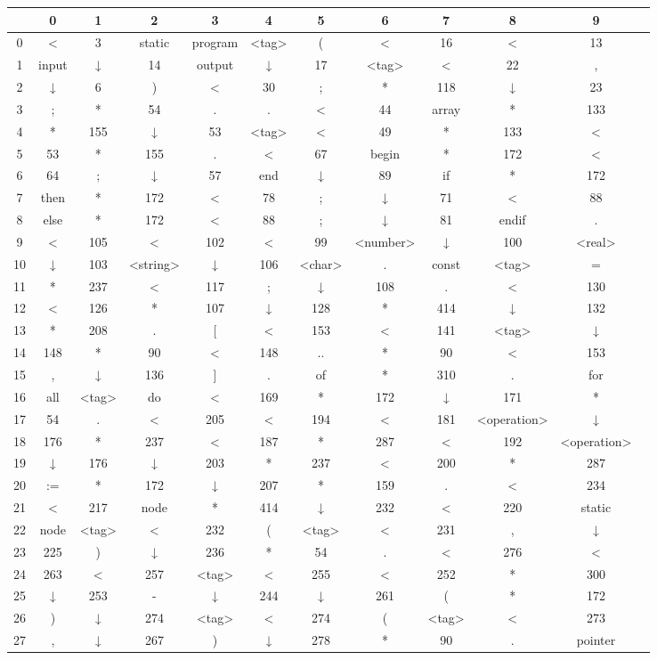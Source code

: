 \documentclass[12pt]{article}
\begin{document}
\begin{table}
\begin{small}
\begin{tabular}{|c|c|c|c|c|c|c|c|c|c|c|c|}
\hline
\ &0&1&2&3&4&5&6&7&8&9\\
\hline
0&<&3&static&program&<tag>&(&<&16&<&13\\
\hline
1&input&↓&14&output&↓&17&<tag>&<&22&,\\
\hline
2&↓&6&)&<&30&;&*&118&↓&23\\
\hline
3&;&*&54&.&.&<&44&array&*&133\\
\hline
4&*&155&↓&53&<tag>&<&49&*&133&<\\
\hline
5&53&*&155&.&<&67&begin&*&172&<\\
\hline
6&64&;&↓&57&end&↓&89&if&*&172\\
\hline
7&then&*&172&<&78&;&↓&71&<&88\\
\hline
8&else&*&172&<&88&;&↓&81&endif&.\\
\hline
9&<&105&<&102&<&99&\scriptsize{<number>}&↓&100&<real>\\
\hline
10&↓&103&<string>&↓&106&<char>&.&const&<tag>&=\\
\hline
11&*&237&<&117&;&↓&108&.&<&130\\
\hline
12&<&126&*&107&↓&128&*&414&↓&132\\
\hline
13&*&208&.&[&<&153&<&141&<tag>&↓\\
\hline
14&148&*&90&<&148&..&*&90&<&153\\
\hline
15&,&↓&136&]&.&of&*&310&.&for\\
\hline
16&all&<tag>&do&<&169&*&172&↓&171&*\\
\hline
17&54&.&<&205&<&194&<&181&\scriptsize{<operation>}&↓\\
\hline
18&176&*&237&<&187&*&287&<&192&\scriptsize{<operation>}\\
\hline
19&↓&176&↓&203&*&237&<&200&*&287\\
\hline
20&:=&*&172&↓&207&*&159&.&<&234\\
\hline
21&<&217&node&*&414&↓&232&<&220&static\\
\hline
22&node&<tag>&<&232&(&<tag>&<&231&,&↓\\
\hline
23&225&)&↓&236&*&54&.&<&276&<\\
\hline
24&263&<&257&<tag>&<&255&<&252&*&300\\
\hline
25&↓&253&-&↓&244&↓&261&(&*&172\\
\hline
26&)&↓&274&<tag>&<&274&(&<tag>&<&273\\
\hline
27&,&↓&267&)&↓&278&*&90&.&pointer\\

\end{tabular}
\end{small}
\end{table}
\end{document}
